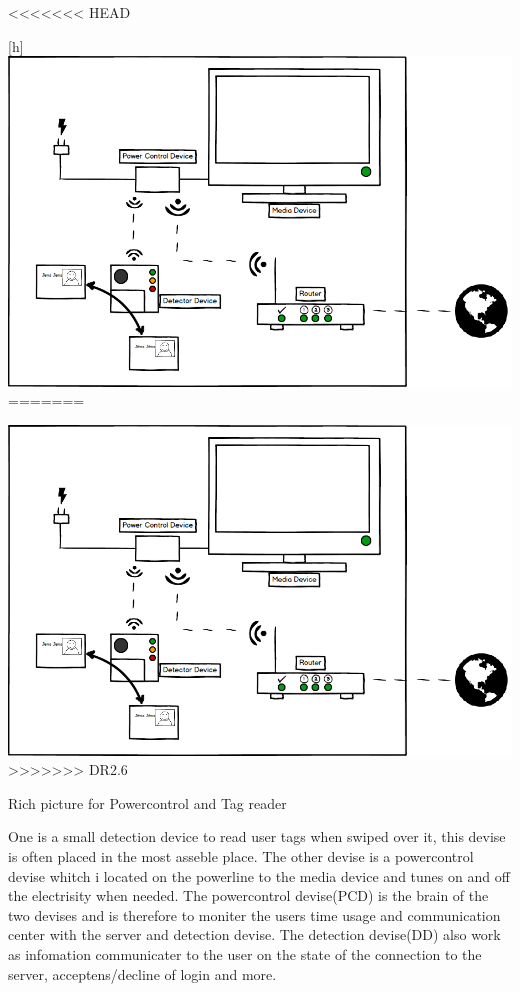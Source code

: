 <<<<<<< HEAD
\begin{center}[h]
	\centering
		\includegraphics[width=1.00\textwidth]{images/Power&Tagdevice.png}
=======
\begin{center}
	\includegraphics[width=1.00\textwidth]{images/Power&Tagdevice.png}	
>>>>>>> DR2.6
	\caption{Rich picture for Powercontrol and Tag reader}
	\label{fig:Power&Tagdevice}
\end{center}

One is a small detection device to read user tags when swiped over it, this devise is often placed in the most asseble place. \newline
The other devise is a powercontrol devise whitch i located on the powerline to the media device and tunes on and off the electrisity when needed.\newline
The powercontrol devise(PCD) is the brain of the two devises and is therefore to moniter the users time usage and communication center with the server and detection devise. \newline
The detection devise(DD) also work as infomation communicater to the user on the state of the connection to the server, acceptens/decline of login and more. \newline    


\end{center}
